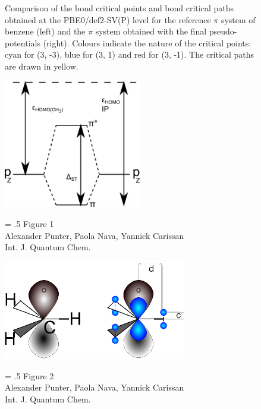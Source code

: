 \documentclass[12pt]{article}
\begin{document}
\begin{figure}
\caption{Comparison of the bond critical points and bond critical paths obtained at the PBE0/def2-SV(P)
level for the
reference $\pi$ system of benzene (left) and the $\pi$ system obtained with the final pseudo-potentials (right).
Colours indicate the nature of the critical points: cyan for (3, -3), blue for (3, 1) and red for (3, -1).
The critical paths are drawn in yellow.}
\label{fig:aim_c6h6}
\end{figure}

\clearpage

\begin{figure}
\begin{center}
\includegraphics[width=6cm]{diagram}
\end{center}
{\Large
\begin{minipage}[t]{3in}
\baselineskip = .5\baselineskip
Figure 1 \\
Alexander Punter, Paola Nava, Yannick Carissan\\
Int. J. Quantum Chem.
\end{minipage}
}
\end{figure}

\clearpage

\begin{figure}
\begin{center}
\includegraphics[width=8cm]{scheme_complete.eps}
\end{center}
{\Large
\begin{minipage}[t]{3in}
\baselineskip = .5\baselineskip
Figure 2 \\
Alexander Punter, Paola Nava, Yannick Carissan\\
Int. J. Quantum Chem.
\end{minipage}
}
\end{figure}
\end{document}
